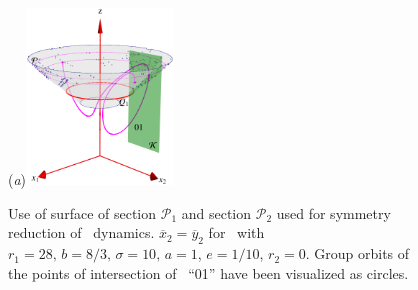 \begin{figure}[ht]
\begin{center}
  (\textit{a})\includegraphics[width=0.35\textwidth]{../figs/CLEmartini.eps}
\end{center}
\caption[\CLe desymmetrization with double section]{Use of \Poincare
surface of section $\mathcal{P}_1$ and section $\mathcal{P}_2$ used for symmetry
reduction of \CLe\ dynamics.
$\overline{x}_2=\overline{y}_2$ for \CLe\ with $r_1=28,\, b=8/3,\, \sigma=10,\, a=1$, $e=1/10$, $r_2=0$.
Group orbits of the points of intersection of \rpo\ ``01'' have been visualized as circles.
    }
\label{fig:CLEmartini}
\end{figure}
